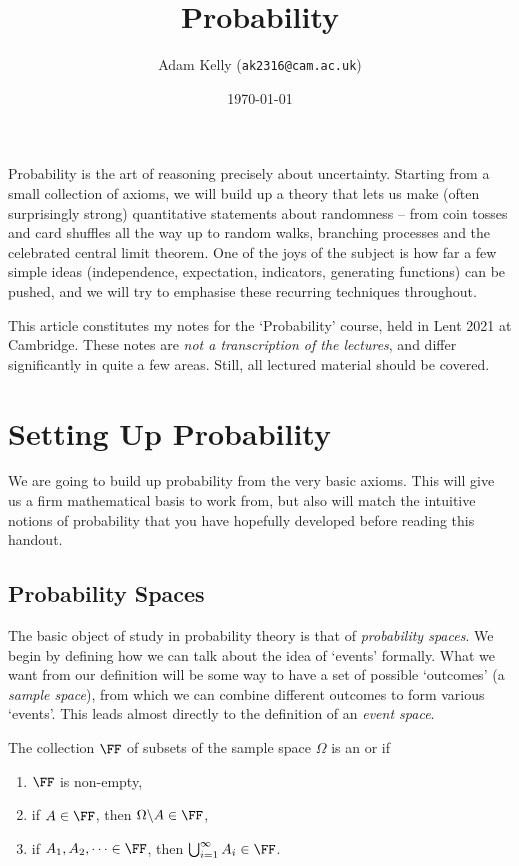 \documentclass[a4paper]{scrartcl}
\title{Probability}
\author{Adam Kelly (\texttt{ak2316@cam.ac.uk})}
\date{\today}
\begin{document}
\maketitle


Probability is the art of reasoning precisely about uncertainty. Starting from a small collection of axioms, we will build up a theory that lets us make (often surprisingly strong) quantitative statements about randomness -- from coin tosses and card shuffles all the way up to random walks, branching processes and the celebrated central limit theorem. One of the joys of the subject is how far a few simple ideas (independence, expectation, indicators, generating functions) can be pushed, and we will try to emphasise these recurring techniques throughout.

This article constitutes my notes for the `Probability' course, held in Lent 2021 at Cambridge. These notes are \emph{not a transcription of the lectures}, and differ significantly in quite a few areas. Still, all lectured material should be covered.

\tableofcontents

\section{Setting Up Probability}

We are going to build up probability from the very basic axioms. This will give us a firm mathematical basis to work from, but also will match the intuitive notions of probability that you have hopefully developed before reading this handout.

\subsection{Probability Spaces}

The basic object of study in probability theory is that of \emph{probability spaces}. We begin by defining how we can talk about the idea of `events' formally. What we want from our definition will be some way to have a set of possible `outcomes' (a \emph{sample space}), from which we can combine different outcomes to form various `events'. This leads almost directly to the definition of an \emph{event space}.

\begin{definition} The collection $\FF$ of subsets of the sample space $\Omega$ is an  or  if
	\begin{enumerate}
		\item $\FF$ is non-empty,
		\item if $A \in \FF$, then $\Omega \backslash A \in \FF$,
		\item if $A_1, A_2, \dots \in \FF$, then $\bigcup_{i = 1}^{\infty} A_i \in \FF$.
	\end{enumerate}
\end{definition}
\end{document}
